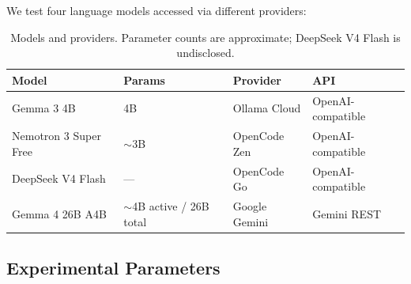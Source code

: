 \documentclass{article}
\begin{document}
We test four language models accessed via different providers:

\begin{table}[h]
    \centering
    \caption{Models and providers. Parameter counts are approximate; DeepSeek V4 Flash is undisclosed.}
    \label{tab:models}
    \begin{tabular}{llll}
        \toprule
        Model & Params & Provider & API \\
        \midrule
        Gemma 3 4B & 4B & Ollama Cloud & OpenAI-compatible \\
        Nemotron 3 Super Free & $\sim$3B & OpenCode Zen & OpenAI-compatible \\
        DeepSeek V4 Flash & --- & OpenCode Go & OpenAI-compatible \\
        Gemma 4 26B A4B   & $\sim$4B active / 26B total & Google Gemini & Gemini REST \\
        \bottomrule
    \end{tabular}
\end{table}

\subsection{Experimental Parameters}
\end{document}
